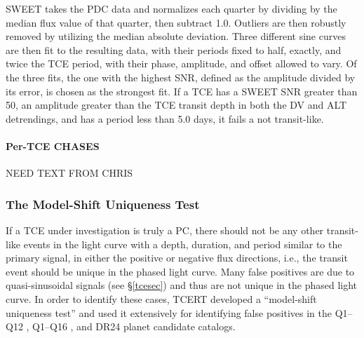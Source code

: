 SWEET takes the PDC data and normalizes each quarter by dividing by the median flux value of that quarter, then subtract 1.0. Outliers are then robustly removed by utilizing the median absolute deviation. Three different sine curves are then fit to the resulting data, with their periods fixed to half, exactly, and twice the TCE period, with their phase, amplitude, and offset allowed to vary. Of the three fits, the one with the highest SNR, defined as the amplitude divided by its error, is chosen as the strongest fit. If a TCE has a SWEET SNR greater than 50, an amplitude greater than the TCE transit depth in both the DV and ALT detrendings, and has a period less than 5.0 days, it fails a not transit-like.




\paragraph{Per-TCE CHASES}

NEED TEXT FROM CHRIS









\subsubsection{The Model-Shift Uniqueness Test}
\label{notuniquetcesec}

If a TCE under investigation is truly a PC, there should not be any other transit-like events in the light curve with a depth, duration, and period similar to the primary signal, in either the positive or negative flux directions, i.e., the transit event should be unique in the phased light curve. Many false positives are due to quasi-sinusoidal signals (see \S\ref{tcesec}) and thus are not unique in the phased light curve. In order to identify these cases, TCERT developed a ``model-shift uniqueness test'' and used it extensively for identifying false positives in the Q1--Q12 \citep{Rowe2015a}, Q1--Q16 \citep{Mullally2015cat}, and DR24 \citep{Coughlin2016} planet candidate catalogs.

